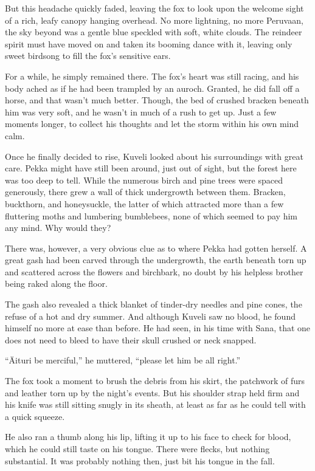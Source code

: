 But this headache quickly faded, leaving the fox to look upon the welcome sight of a rich, leafy canopy hanging overhead. No more lightning, no more Peruvaan, the sky beyond was a gentle blue speckled with soft, white clouds. The reindeer spirit must have moved on and taken its booming dance with it, leaving only sweet birdsong to fill the fox's sensitive ears.

For a while, he simply remained there. The fox's heart was still racing, and his body ached as if he had been trampled by an auroch. Granted, he did fall off a horse, and that wasn't much better. Though, the bed of crushed bracken beneath him was very soft, and he wasn't in much of a rush to get up. Just a few moments longer, to collect his thoughts and let the storm within his own mind calm.

Once he finally decided to rise, Kuveli looked about his surroundings with great care. Pekka might have still been around, just out of sight, but the forest here was too deep to tell. While the numerous birch and pine trees were spaced generously, there grew a wall of thick undergrowth between them. Bracken, buckthorn, and honeysuckle, the latter of which attracted more than a few fluttering moths and lumbering bumblebees, none of which seemed to pay him any mind. Why would they?

There was, however, a very obvious clue as to where Pekka had gotten herself. A great gash had been carved through the undergrowth, the earth beneath torn up and scattered across the flowers and birchbark, no doubt by his helpless brother being raked along the floor.

The gash also revealed a thick blanket of tinder-dry needles and pine cones, the refuse of a hot and dry summer. And although Kuveli saw no blood, he found himself no more at ease than before. He had seen, in his time with Sana, that one does not need to bleed to have their skull crushed or neck snapped.

``Äituri be merciful,'' he muttered, ``please let him be all right.''

The fox took a moment to brush the debris from his skirt, the patchwork of furs and leather torn up by the night's events. But his shoulder strap held firm and his knife was still sitting snugly in its sheath, at least as far as he could tell with a quick squeeze.

He also ran a thumb along his lip, lifting it up to his face to check for blood, which he could still taste on his tongue. There were flecks, but nothing substantial. It was probably nothing then, just bit his tongue in the fall.

